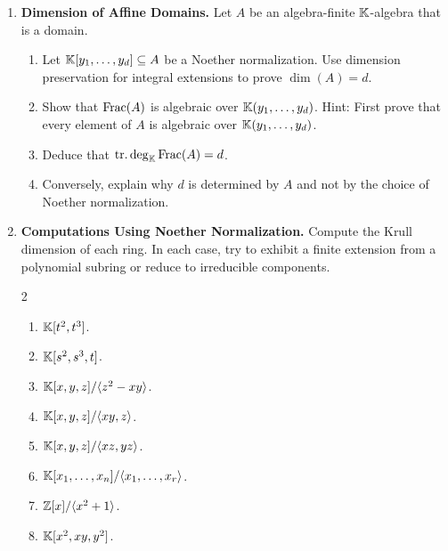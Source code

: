\documentclass[12pt,reqno]{amsart}
\begin{document}
\begin{enumerate}[leftmargin=*, resume=problems]

\item \textbf{Dimension of Affine Domains.} Let $A$ be an algebra-finite $\mathbb{K}$-algebra that is a domain.
\begin{enumerate}
    \item Let $\mathbb{K}[y_1,\ldots,y_d]\subseteq A$ be a Noether normalization. Use dimension preservation for integral extensions to prove $\dim(A)=d$.
    \item Show that $\operatorname{Frac}(A)$ is algebraic over $\mathbb{K}(y_1,\ldots,y_d)$. Hint: First prove that every element of $A$ is algebraic over $\mathbb{K}(y_1,\ldots,y_d)$.
    \item Deduce that $\operatorname{tr.deg}_{\mathbb{K}}\operatorname{Frac}(A)=d$.
    \item Conversely, explain why $d$ is determined by $A$ and not by the choice of Noether normalization.
\end{enumerate}

\item \textbf{Computations Using Noether Normalization.} Compute the Krull dimension of each ring. In each case, try to exhibit a finite extension from a polynomial subring or reduce to irreducible components.
\begin{multicols}{2}
\begin{enumerate}
    \item $\mathbb{K}[t^2,t^3]$.
    \item $\mathbb{K}[s^2,s^3,t]$.
    \item $\mathbb{K}[x,y,z]/\langle z^2-xy\rangle$.
    \item $\mathbb{K}[x,y,z]/\langle xy,z\rangle$.
    \item $\mathbb{K}[x,y,z]/\langle xz,yz\rangle$.
    \item $\mathbb{K}[x_1,\ldots,x_n]/\langle x_1,\ldots,x_r\rangle$.
    \item $\mathbb{Z}[x]/\langle x^2+1\rangle$.
    \item $\mathbb{K}[x^2,xy,y^2]$.
\end{enumerate}
\end{multicols}


\end{enumerate}
\end{document}
